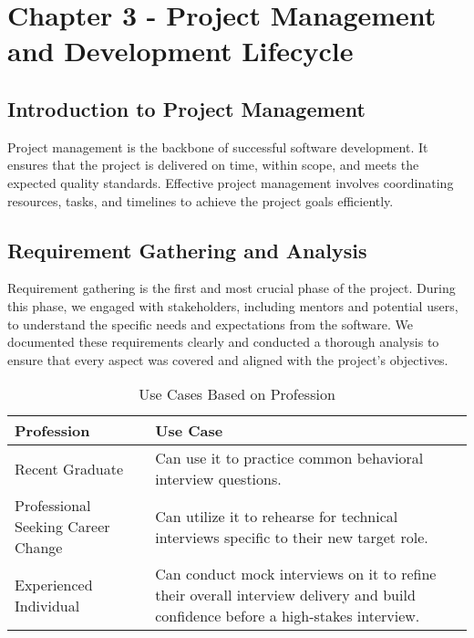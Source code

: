 \section{Chapter 3 - Project Management and Development Lifecycle}
\subsection{Introduction to Project Management}
Project management is the backbone of successful software development. It ensures that the project is delivered on time, within scope, and meets the expected quality standards. Effective project management involves coordinating resources, tasks, and timelines to achieve the project goals efficiently.

\subsection{Requirement Gathering and Analysis}
Requirement gathering is the first and most crucial phase of the project. During this phase, we engaged with stakeholders, including mentors and potential users, to understand the specific needs and expectations from the software. We documented these requirements clearly and conducted a thorough analysis to ensure that every aspect was covered and aligned with the project’s objectives.

\begin{table}[h!]
\centering
\begin{tabular}{|l|p{10cm}|}
\hline
\textbf{Profession} & \textbf{Use Case} \\ \hline
Recent Graduate & Can use it to practice common behavioral interview questions. \\ \hline
Professional Seeking Career Change & Can utilize it to rehearse for technical interviews specific to their new target role. \\ \hline
Experienced Individual & Can conduct mock interviews on it to refine their overall interview delivery and build confidence before a high-stakes interview. \\ \hline
\end{tabular}
\caption{Use Cases Based on Profession}
\end{table}

